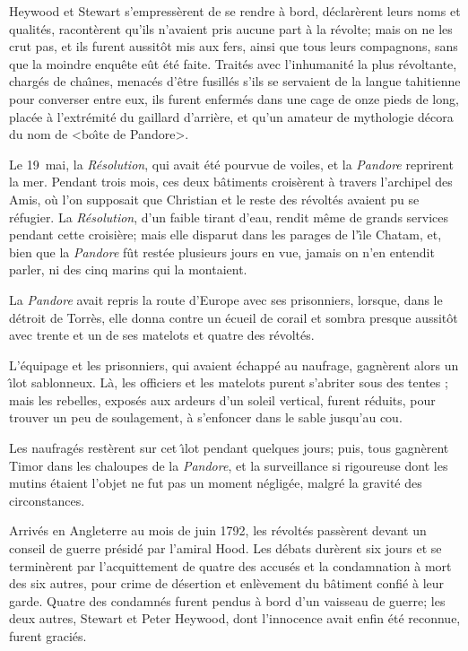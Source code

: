 Heywood et Stewart s'empress\`erent de se rendre
\`a bord, d\'e\-cla\-r\`erent leurs noms
et qualit\'es, racont\`erent qu'ils n'avaient
pris aucune part \`a la r\'evolte; mais on ne les
crut pas, et ils furent aussit\^ot mis aux fers,
ainsi que tous leurs compagnons, sans que la moindre
enqu\^ete e\^ut \'et\'e faite.
Trait\'es avec l'inhumanit\'e la plus
r\'evoltante, charg\'es de cha{\^\i}nes,
menac\'es d'\^etre fusill\'es s'ils se
servaient de la langue tahitienne pour converser entre eux,
ils furent enferm\'es dans une cage de onze pieds
de long, plac\'ee \`a l'extr\'emit\'e
du gaillard d'arri\`ere, et qu'un amateur de mythologie
d\'ecora du nom de <bo{\^\i}te de Pandore>.

Le 19~mai, la {\sl R\'esolution}, qui avait
\'et\'e pourvue de voiles, et la {\sl Pandore\/}
reprirent la mer. Pendant trois mois, ces deux b\^atiments
crois\`erent \`a travers l'archipel des Amis,
o\`u l'on supposait que Christian et le reste des
r\'evolt\'es avaient pu se r\'efugier.
La {\sl R\'esolution}, d'un faible tirant d'eau,
rendit m\^eme de grands services pendant cette
croisi\`ere; mais elle disparut dans les parages
de l'{\^\i}le Chatam, et, bien que la {\sl Pandore\/}
f\^ut rest\'ee plusieurs jours en vue, jamais
on n'en entendit parler, ni des cinq marins qui la montaient.

La {\sl Pandore\/} avait repris la route d'Europe avec
ses prisonniers, lorsque, dans le d\'etroit de Torr\`es,
elle donna contre un \'ecueil de corail et sombra
presque aussit\^ot avec trente et un de ses matelots
et quatre des r\'evolt\'es.

L'\'equipage et les prisonniers, qui avaient
\'echapp\'e au naufrage, gagn\`erent
alors un {\^\i}lot sablonneux.
L\`a, les officiers et les matelots purent
s'abriter sous des tentes ; mais les rebelles,
expos\'es aux ardeurs d'un soleil vertical,
furent r\'eduits, pour trouver un peu de
soulagement, \`a s'enfoncer dans le sable jusqu'au cou.

Les naufrag\'es rest\`erent sur cet {\^\i}lot
pendant quelques jours; puis, tous gagn\`erent Timor
dans les chaloupes de la {\sl Pandore}, et la surveillance
si rigoureuse dont les mutins \'etaient l'objet
ne fut pas un moment n\'eglig\'ee,
malgr\'e la gravit\'e des circonstances.

Arriv\'es en Angleterre au mois de juin 1792,
les r\'evolt\'es pass\`erent devant un
conseil de guerre pr\'esid\'e par l'amiral Hood.
Les d\'ebats dur\`erent six jours et se
termin\`erent par l'acquittement de quatre des
accus\'es et la condamnation \`a mort des six autres,
pour crime de d\'esertion et enl\`evement
du b\^atiment confi\'e \`a leur garde.
Quatre des condamn\'es furent pendus \`a bord
d'un vaisseau de guerre; les deux autres, Stewart
et Peter Heywood, dont l'innocence avait enfin \'et\'e
reconnue, furent graci\'es.

